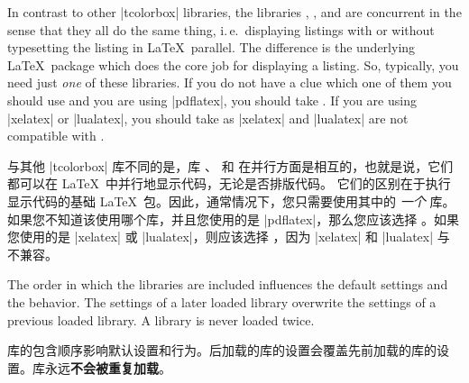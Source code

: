 In contrast to other |tcolorbox| libraries, the libraries
, , and  are concurrent in the sense that
they all do the same thing, i.\,e.\ displaying listings with or without typesetting
the listing in \LaTeX\ parallel.
The difference is the underlying \LaTeX\ package which does the core job for
displaying a listing. So, typically, you need just \emph{one} of these
libraries. If you do not have a clue which one of them you should use
and you are using |pdflatex|, you should take .
If you are using |xelatex| or |lualatex|, you should take 
as |xelatex| and |lualatex| are not compatible with .

与其他 |tcolorbox| 库不同的是，库 、 和  在并行方面是相互的，也就是说，它们都可以在 \LaTeX\ 中并行地显示代码，无论是否排版代码。 它们的区别在于执行显示代码的基础 \LaTeX\ 包。因此，通常情况下，您只需要使用其中的 \emph{一个} 库。如果您不知道该使用哪个库，并且您使用的是 |pdflatex|，那么您应该选择 。如果您使用的是 |xelatex| 或 |lualatex|，则应该选择 ，因为 |xelatex| 和 |lualatex| 与  不兼容。



\begin{marker}
The order in which the libraries are included influences the default settings and
the  behavior. The settings of a later loaded library overwrite
the settings of a previous loaded library. A library is never loaded twice.

库的包含顺序影响默认设置和行为。后加载的库的设置会覆盖先前加载的库的设置。库永远{\bf 不会被重复加载}。
\end{marker}
